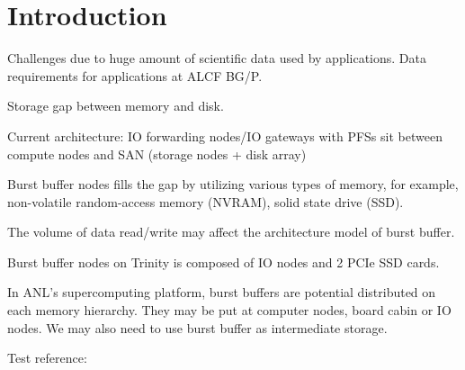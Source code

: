 \section{Introduction}

Challenges due to huge amount of scientific data used by applications.
Data requirements for applications at ALCF BG/P.

Storage gap between memory and disk.

Current architecture: IO forwarding nodes/IO gateways with PFSs sit between compute nodes and SAN (storage nodes + disk array)

Burst buffer nodes fills the gap by utilizing various types of memory, for example, non-volatile random-access memory (NVRAM), solid state drive (SSD).

The volume of data read/write may affect the architecture model of burst buffer.

Burst buffer nodes on Trinity is composed of IO nodes and 2 PCIe SSD cards.

In ANL's supercomputing platform, burst buffers are potential distributed on each memory hierarchy.
They may be put at computer nodes, board cabin or IO nodes.
We may also need to use burst buffer as intermediate storage.


Test reference:\cite{Liu:MSST:12}
\cite{SlurmBBGuide}
\cite{Romanus:CORR:15}



